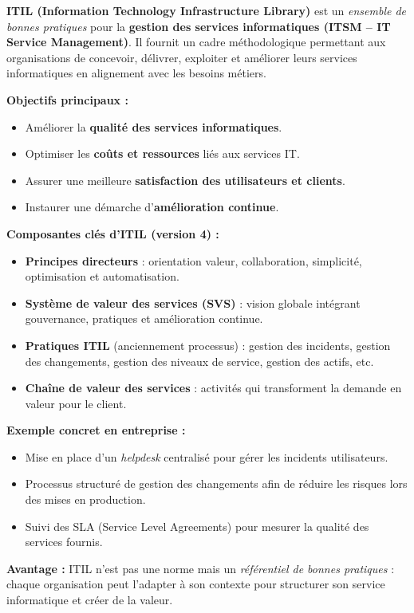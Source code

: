 \documentclass[a4paper,11pt]{article}
\begin{document}
\begin{tcolorbox}[colback=yellow!5,colframe=yellow!60!black,title=Qu'est-ce que l'ITIL ?]

\textbf{ITIL (Information Technology Infrastructure Library)} est un \textit{ensemble de bonnes pratiques} 
pour la \textbf{gestion des services informatiques (ITSM – IT Service Management)}.  
Il fournit un cadre méthodologique permettant aux organisations de concevoir, délivrer, exploiter et améliorer 
leurs services informatiques en alignement avec les besoins métiers.  

\medskip
\textbf{Objectifs principaux :}
\begin{itemize}
  \item Améliorer la \textbf{qualité des services informatiques}.
  \item Optimiser les \textbf{coûts et ressources} liés aux services IT.
  \item Assurer une meilleure \textbf{satisfaction des utilisateurs et clients}.
  \item Instaurer une démarche d’\textbf{amélioration continue}.
\end{itemize}

\medskip
\textbf{Composantes clés d’ITIL (version 4) :}
\begin{itemize}
  \item \textbf{Principes directeurs} : orientation valeur, collaboration, simplicité, optimisation et automatisation.
  \item \textbf{Système de valeur des services (SVS)} : vision globale intégrant gouvernance, pratiques et amélioration continue.
  \item \textbf{Pratiques ITIL} (anciennement processus) : gestion des incidents, gestion des changements, gestion des niveaux de service, gestion des actifs, etc.
  \item \textbf{Chaîne de valeur des services} : activités qui transforment la demande en valeur pour le client.
\end{itemize}

\medskip
\textbf{Exemple concret en entreprise :}
\begin{itemize}
  \item Mise en place d’un \textit{helpdesk} centralisé pour gérer les incidents utilisateurs.
  \item Processus structuré de gestion des changements afin de réduire les risques lors des mises en production.
  \item Suivi des SLA (Service Level Agreements) pour mesurer la qualité des services fournis.
\end{itemize}

\medskip
\textbf{Avantage :} ITIL n’est pas une norme mais un \textit{référentiel de bonnes pratiques} : 
chaque organisation peut l’adapter à son contexte pour structurer son service informatique et créer de la valeur.
\end{tcolorbox}
\end{document}
